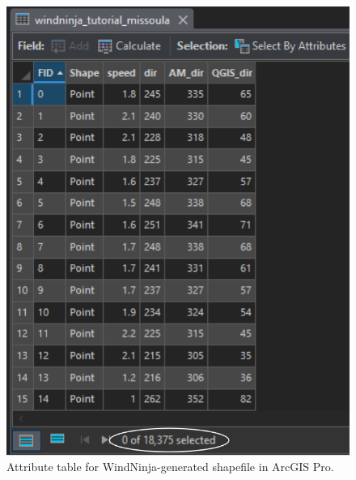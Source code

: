 \documentclass[12pt]{article}
\begin{document}
\begin{figure}[H]
	\centering
	\includegraphics[scale=0.45]{arc_20.png}
	\caption{Attribute table for WindNinja-generated shapefile in ArcGIS Pro.}
\label{fig:Figure20}
\end{figure}
\end{document}
